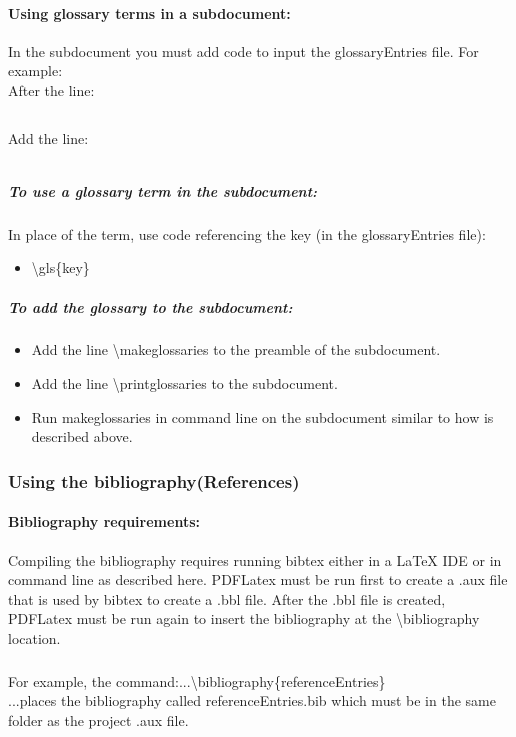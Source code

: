 \documentclass[class=book , crop=false]{standalone}
\begin{document}
\paragraph{Using glossary terms in a subdocument:}
In the subdocument you must add code to input the glossaryEntries file.  For example:\\
After the line:
\begin{verbatim}

\end{verbatim}
Add the line:
\begin{verbatim}

\end{verbatim}
\subparagraph[To use a glossary term]{To use a glossary term in the subdocument:\texorpdfstring{\\}{}}
In place of the term, use code referencing the key (in the glossaryEntries file):
\begin{itemize}
\item \textbackslash gls\{key\}
\end{itemize}
\subparagraph{To add the glossary to the subdocument:}
\begin{itemize}
\item Add the line \textbackslash makeglossaries to the preamble of the subdocument.
\item Add the line \textbackslash printglossaries to the subdocument.
\item Run makeglossaries in command line on the subdocument similar to how is described above.
\end{itemize}




\subsubsection[Using the bibliography(References)]{{\Large Using the bibliography(References)}}
\paragraph{Bibliography requirements:}
Compiling the bibliography requires running bibtex either in a \LaTeX{} IDE or in command line as described here.  PDFLatex must be run first to create a .aux file that is used by bibtex to create a .bbl file.  After the .bbl file is created, PDFLatex must be run again to insert the bibliography at the \textbackslash bibliography location. \subparagraph{}
For example, the command:...\textbackslash bibliography\{referenceEntries\}\\
...places the bibliography called referenceEntries.bib which must be in the same folder as the project .aux file.
\end{document}
